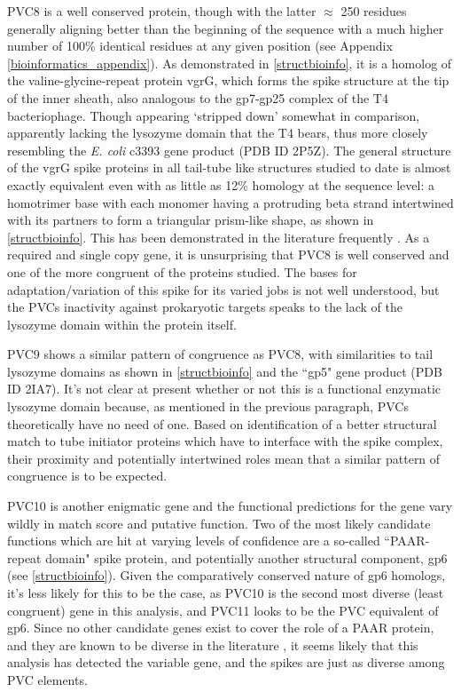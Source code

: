 PVC8 is a well conserved protein, though with the latter $\approx$ 250 residues generally aligning better than the beginning of the sequence with a much higher number of 100\% identical residues at any given position (see Appendix \vref{bioinformatics_appendix}). As demonstrated in \vref{structbioinfo}, it is a homolog of the valine-glycine-repeat protein vgrG, which forms the spike structure at the tip of the inner sheath, also analogous to the gp7-gp25 complex of the T4 bacteriophage. Though appearing `stripped down' somewhat in comparison, apparently lacking the lysozyme domain that the T4 bears, thus more closely resembling the \emph{E. coli} c3393 gene product (PDB ID 2P5Z). The general structure of the vgrG spike proteins in all tail-tube like structures studied to date is almost exactly equivalent even with as little as 12\% homology at the sequence level: a homotrimer base with each monomer having a protruding beta strand intertwined with its partners to form a triangular prism-like shape, as shown in \vref{structbioinfo}. This has been demonstrated in the literature frequently \citep{Leiman2009}. As a required and single copy gene, it is unsurprising that PVC8 is well conserved and one of the more congruent of the proteins studied. The bases for adaptation/variation of this spike for its varied jobs is not well understood, but the PVCs inactivity against prokaryotic targets speaks to the lack of the lysozyme domain within the protein itself.

PVC9 shows a similar pattern of congruence as PVC8, with similarities to tail lysozyme domains as shown in \vref{structbioinfo} \citep{Arisaka2003} and the ``gp5" gene product (PDB ID 2IA7). It's not clear at present whether or not this is a functional enzymatic lysozyme domain because, as mentioned in the previous paragraph, PVCs theoretically have no need of one. Based on identification of a better structural match to tube initiator proteins which have to interface with the spike complex, their proximity and potentially intertwined roles mean that a similar pattern of congruence is to be expected.

PVC10 is another enigmatic gene and the functional predictions for the gene vary wildly in match score and putative function. Two of the most likely candidate functions which are hit at varying levels of confidence are a so-called ``PAAR-repeat domain" spike protein, and potentially another structural component, gp6 (see \vref{structbioinfo}). Given the comparatively conserved nature of gp6 homologs, it's less likely for this to be the case, as PVC10 is the second most diverse (least congruent) gene in this analysis, and PVC11 looks to be the PVC equivalent of gp6. Since no other candidate genes exist to cover the role of a PAAR protein, and they are known to be diverse in the literature \citep{Shneider2013}, it seems likely that this analysis has detected the variable gene, and the spikes are just as diverse among PVC elements.

